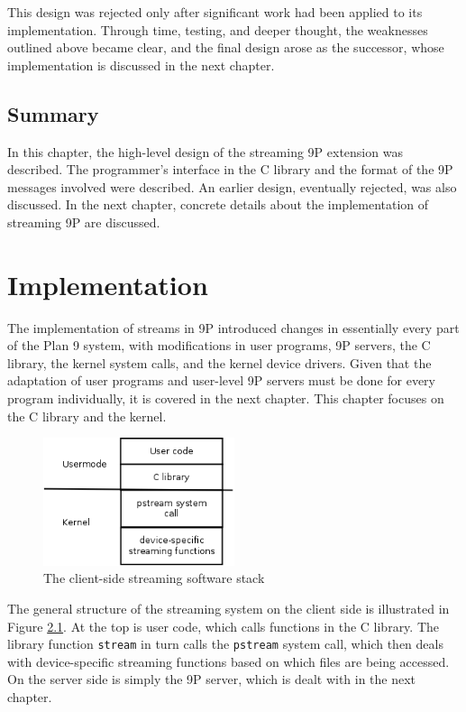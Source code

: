 \documentclass[11pt,american]{report}
\begin{document}
This design was rejected only after significant work had been applied to its implementation. Through time, testing, and deeper thought, the weaknesses outlined above became clear, and the final design arose as the successor, whose implementation is discussed in the next chapter.

\section{Summary}

In this chapter, the high-level design of the streaming 9P extension was described. The programmer's interface in the C library and the format of the 9P messages involved were described. An earlier design, eventually rejected, was also discussed. In the next chapter, concrete details about the implementation of streaming 9P are discussed.

\chapter{Implementation}

The implementation of streams in 9P introduced changes in essentially every part of the Plan 9 system, with modifications in user programs, 9P servers, the C library, the kernel system calls, and the kernel device drivers. Given that the adaptation of user programs and user-level 9P servers must be done for every program individually, it is covered in the next chapter. This chapter focuses on the C library and the kernel.

\begin{figure}[h]
	\begin{center}
		\includegraphics[width=0.5\textwidth]{stack.png}
	\end{center}
	\caption{The client-side streaming software stack}
	\label{figure:stack}
\end{figure}

The general structure of the streaming system on the client side is illustrated in Figure \ref{figure:stack}. At the top is user code, which calls functions in the C library. The library function {\tt stream} in turn calls the {\tt pstream} system call, which then deals with device-specific streaming functions based on which files are being accessed. On the server side is simply the 9P server, which is dealt with in the next chapter.
\end{document}
